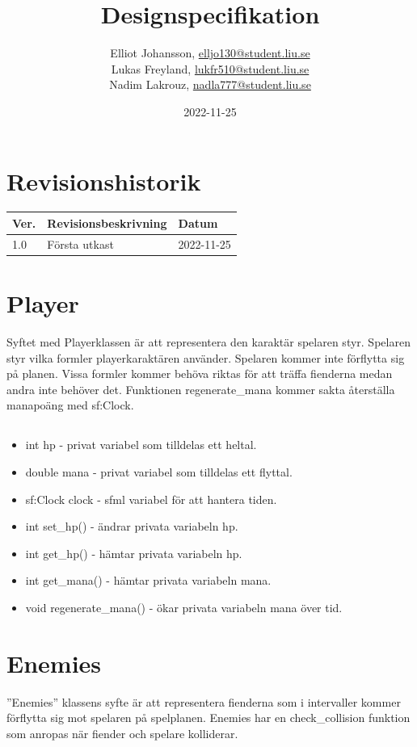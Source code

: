 \documentclass{TDP005mall}
\author{Elliot Johansson, \url{elljo130@student.liu.se}\\
  Lukas Freyland, \url{lukfr510@student.liu.se}\\
  Nadim Lakrouz, \url{nadla777@student.liu.se}}
\title{Designspecifikation}
\date{2022-11-25}
\begin{document}
\projectpage
\section{Revisionshistorik}
\begin{table}[!h]
\begin{tabularx}{\linewidth}{|l|X|l|}
\hline
Ver. & Revisionsbeskrivning & Datum \\\hline

1.0 & Första utkast & 2022-11-25 \\\hline
\end{tabularx}
\end{table}

\section{Player}

Syftet med Playerklassen är att representera den karaktär spelaren styr. Spelaren styr vilka formler playerkaraktären använder. Spelaren kommer inte förflytta sig på planen. Vissa formler kommer behöva riktas för att träffa fienderna medan andra inte behöver det.
Funktionen regenerate\_mana kommer sakta återställa manapoäng med sf:Clock.

\subsection{}

\begin{itemize}
    \item int hp - privat variabel som tilldelas ett heltal. 
    \item double mana - privat variabel som tilldelas ett flyttal. 
    \item sf:Clock clock - sfml variabel för att hantera tiden.
    \item int set\_hp() - ändrar privata variabeln hp.
    \item int get\_hp() - hämtar privata variabeln hp.
    \item int get\_mana() - hämtar privata variabeln mana.
    \item void regenerate\_mana() - ökar privata variabeln mana över tid.
   
\end{itemize}


\section{Enemies}
''Enemies'' klassens syfte är att representera fienderna som i intervaller kommer förflytta sig mot spelaren på spelplanen. Enemies har en check\_collision funktion som anropas när fiender och spelare kolliderar.
\end{document}
